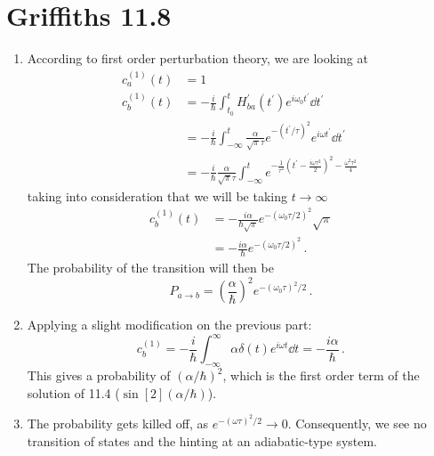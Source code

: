 \documentclass[11pt]{article}
\begin{document}
\section*{Griffiths 11.8}
\begin{enumerate}[label=\alph*)]
\item According to first order perturbation theory, we are looking at
\begin{align*}
c_a^{(1)}(t) & = 1\\
c_b^{(1)}(t) & = -\frac{i}{\hbar} \int_{t_0}^t H^\prime_{ba}(t^\prime)e^{i\omega_0 t^\prime}\dd{t^\prime}\\
& = - \frac{i}{\hbar}\int_{-\infty}^t\frac{\alpha}{\sqrt{\pi}\tau} e^{-(t^\prime/\tau)^2}e^{i\omega t^\prime} \dd{t^\prime}\\
& = -\frac{i}{\hbar}\frac{\alpha}{\sqrt{\pi}\tau}\int_{-\infty}^t e^{-\frac{1}{\tau^2}\left(t^\prime - \frac{i\omega\tau^2}{2}\right)^2 - \frac{\omega^2 \tau^2}{4}}\, 
\end{align*}
taking into consideration that we will be taking $t \rightarrow \infty$
\begin{align*}
c_b^{(1)}(t) & = - \frac{i\alpha}{\hbar \sqrt{\pi}}e^{-(\omega_0 \tau/2)^2}\sqrt{\pi}\\
& = - \frac{i\alpha}{\hbar}e^{-(\omega_0 \tau/2)^2} \, .
\end{align*}
The probability of the transition will then be 
\[\boxed{P_{a\rightarrow b} = \left(\frac{\alpha}{\hbar}\right)^2 e^{-(\omega_0 \tau)^2/2}} \, .\]

\item Applying a slight modification on the previous part:
\[c_b^{(1)} = -\frac{i}{\hbar}\int_{-\infty}^\infty \alpha \delta(t)e^{i\omega t}\dd{t} = -\frac{i\alpha}{\hbar} \, .\]
This gives a probability of $(\alpha/\hbar)^2$, which is the first order term of the solution of 11.4 ($\sin[2](\alpha/\hbar)$).

\item The probability gets killed off, as $e^{-(\omega \tau)^2/2}\rightarrow 0$. Consequently, we see no transition of states and the hinting at an adiabatic-type system.

\end{enumerate}

\newpage
\end{document}
